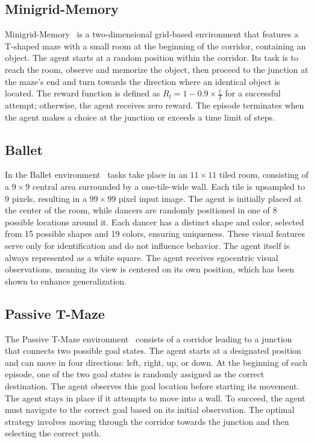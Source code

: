 \subsection{Minigrid-Memory}

Minigrid-Memory~\citep{minigrid_miniworld} is a two-dimensional grid-based environment that features a T-shaped maze with a small room at the beginning of the corridor, containing an object. The agent starts at a random position within the corridor. Its task is to reach the room, observe and memorize the object, then proceed to the junction at the maze’s end and turn towards the direction where an identical object is located. The reward function is defined as $R_t = 1 - 0.9 \times \frac{t}{T}$ for a successful attempt; otherwise, the agent receives zero reward. The episode terminates when the agent makes a choice at the junction or exceeds a time limit of steps. 


\subsection{Ballet}

In the Ballet environment~\citep{hcam} tasks take place in an $11 \times 11$ tiled room, consisting of a $9 \times 9$ central area surrounded by a one-tile-wide wall. Each tile is upsampled to 9 pixels, resulting in a $99 \times 99$ pixel input image. The agent is initially placed at the center of the room, while dancers are randomly positioned in one of 8 possible locations around it. Each dancer has a distinct shape and color, selected from 15 possible shapes and 19 colors, ensuring uniqueness. These visual features serve only for identification and do not influence behavior. The agent itself is always represented as a white square. The agent receives egocentric visual observations, meaning its view is centered on its own position, which has been shown to enhance generalization.


\subsection{Passive T-Maze}

The Passive T-Maze environment~\citep{shine_rl} consists of a corridor leading to a junction that connects two possible goal states. The agent starts at a designated position and can move in four directions: left, right, up, or down. At the beginning of each episode, one of the two goal states is randomly assigned as the correct destination. The agent observes this goal location before starting its movement. The agent stays in place if it attempts to move into a wall. To succeed, the agent must navigate to the correct goal based on its initial observation. The optimal strategy involves moving through the corridor towards the junction and then selecting the correct path.


